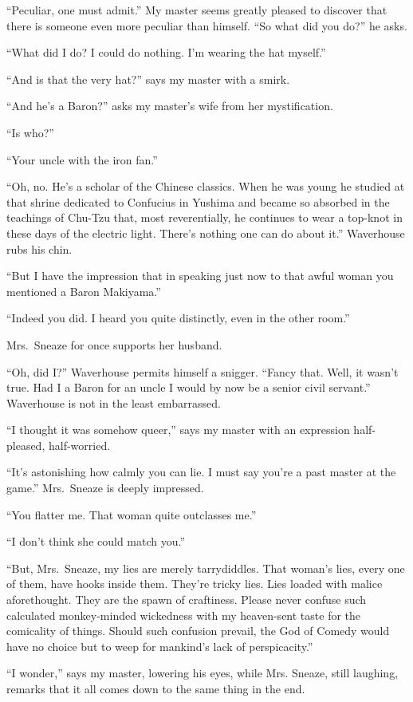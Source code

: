\documentclass[12pt, openright]{book}
\begin{document}
``Peculiar, one must admit.'' My master seems greatly pleased to
discover that there is someone even more peculiar than himself. ``So
what did you do?'' he asks.

``What did I do? I could do nothing. I'm wearing the hat myself.''

``And is that the very hat?'' says my master with a smirk.

``And he's a Baron?'' asks my master's wife from her mystification.

``Is who?''

``Your uncle with the iron fan.''

``Oh, no. He's a scholar of the Chinese classics. When he was young he
studied at that shrine dedicated to Confucius in Yushima and became so
absorbed in the teachings of Chu-Tzu that, most reverentially, he
continues to wear a top-knot in these days of the electric light.
There's nothing one can do about it.'' Waverhouse rubs his chin.

``But I have the impression that in speaking just now to that awful
woman you mentioned a Baron Makiyama.''

``Indeed you did. I heard you quite distinctly, even in the other
room.''

Mrs.~Sneaze for once supports her husband.

``Oh, did I?'' Waverhouse permits himself a snigger. ``Fancy that. Well,
it wasn't true. Had I a Baron for an uncle I would by now be a senior
civil servant.'' Waverhouse is not in the least embarrassed.

``I thought it was somehow queer,'' says my master with an expression
half-pleased, half-worried.

``It's astonishing how calmly you can lie. I must say you're a past
master at the game.'' Mrs.~Sneaze is deeply impressed.

``You flatter me. That woman quite outclasses me.''

``I don't think she could match you.''

``But, Mrs.~Sneaze, my lies are merely tarrydiddles. That woman's lies,
every one of them, have hooks inside them. They're tricky lies. Lies
loaded with malice aforethought. They are the spawn of craftiness.
Please never confuse such calculated monkey-minded wickedness with my
heaven-sent taste for the comicality of things. Should such confusion
prevail, the God of Comedy would have no choice but to weep for
mankind's lack of perspicacity.''

``I wonder,'' says my master, lowering his eyes, while Mrs. Sneaze,
still laughing, remarks that it all comes down to the same thing in the
end.
\end{document}
